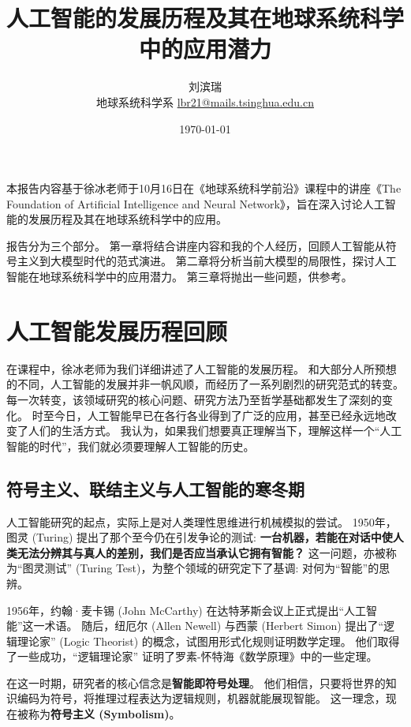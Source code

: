 \documentclass[12pt, a4paper]{article}
\title{{\Large{\textbf{人工智能的发展历程及其在地球系统科学中的应用潜力}}}}
\author{刘滨瑞 \\ 地球系统科学系 \quad \href{mailto:lbr21@mails.tsinghua.edu.cn}{lbr21@mails.tsinghua.edu.cn}}
\date{\today}
\begin{document}
\maketitle



本报告内容基于徐冰老师于10月16日在《地球系统科学前沿》课程中的讲座《The Foundation of Artificial Intelligence and Neural Network》，旨在深入讨论人工智能的发展历程及其在地球系统科学中的应用。

报告分为三个部分。
第一章将结合讲座内容和我的个人经历，回顾人工智能从符号主义到大模型时代的范式演进。
第二章将分析当前大模型的局限性，探讨人工智能在地球系统科学中的应用潜力。
第三章将抛出一些问题，供参考。



\section{人工智能发展历程回顾}

在课程中，徐冰老师为我们详细讲述了人工智能的发展历程。
和大部分人所预想的不同，人工智能的发展并非一帆风顺，而经历了一系列剧烈的研究范式的转变。
每一次转变，该领域研究的核心问题、研究方法乃至哲学基础都发生了深刻的变化。
时至今日，人工智能早已在各行各业得到了广泛的应用，甚至已经永远地改变了人们的生活方式。
我认为，如果我们想要真正理解当下，理解这样一个“人工智能的时代”，我们就必须要理解人工智能的历史。

\subsection{符号主义、联结主义与人工智能的寒冬期}

人工智能研究的起点，实际上是对人类理性思维进行机械模拟的尝试。
1950年，图灵 (Turing) 提出了那个至今仍在引发争论的测试: \textbf{一台机器，若能在对话中使人类无法分辨其与真人的差别，我们是否应当承认它拥有智能？}
这一问题，亦被称为“图灵测试” (Turing Test)，为整个领域的研究定下了基调: 对何为“智能”的思辨。

1956年，约翰·麦卡锡 (John McCarthy) 在达特茅斯会议上正式提出“人工智能”这一术语。
随后，纽厄尔 (Allen Newell) 与西蒙 (Herbert Simon) 提出了“逻辑理论家” (Logic Theorist) 的概念，试图用形式化规则证明数学定理。
他们取得了一些成功，“逻辑理论家” 证明了罗素-怀特海《数学原理》中的一些定理。

在这一时期，研究者的核心信念是\textbf{智能即符号处理}。
他们相信，只要将世界的知识编码为符号，将推理过程表达为逻辑规则，机器就能展现智能。
这一理念，现在被称为\textbf{符号主义 (Symbolism)}。
\end{document}
